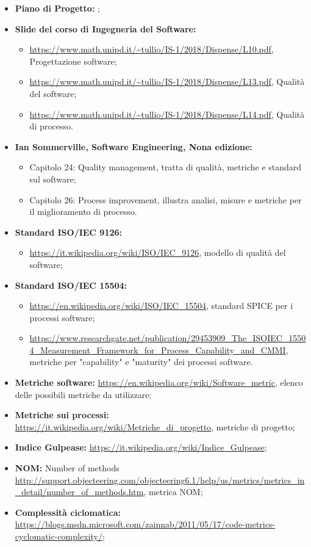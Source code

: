 \begin{itemize}
	\item \textbf{Piano di Progetto:} \PdP;
	\item \textbf{Slide del corso di Ingegneria del Software:}
	\begin{itemize}
				   \item \url{https://www.math.unipd.it/~tullio/IS-1/2018/Dispense/L10.pdf}, Progettazione software;
				   \item \url{https://www.math.unipd.it/~tullio/IS-1/2018/Dispense/L13.pdf}, Qualità del software;
				   \item \url{https://www.math.unipd.it/~tullio/IS-1/2018/Dispense/L14.pdf}, Qualità di processo.
	\end{itemize}
	\item \textbf{Ian Sommerville, Software Engineering, Nona edizione:}
		\begin{itemize}
		  	\item Capitolo 24: Quality management, tratta di qualità, metriche e standard sul software;
		  	\item Capitolo 26: Process improvement, illustra analisi, misure e metriche per il miglioramento di processo.
		\end{itemize}
	\item \textbf{Standard ISO/IEC 9126:}
		\begin{itemize}
			\item \url{https://it.wikipedia.org/wiki/ISO/IEC_9126}, modello di qualità del software;
		\end{itemize}
	\item \textbf{Standard ISO/IEC 15504:}
		 \begin{itemize}
				 \item \url{https://en.wikipedia.org/wiki/ISO/IEC_15504}, standard SPICE per i processi software;
				  \item \url{https://www.researchgate.net/publication/29453909_The_ISOIEC_15504_Measurement_Framework_for_Process_Capability_and_CMMI}, metriche per "capability" e "maturity" dei processi software.
		\end{itemize}
	\item \textbf{Metriche software:}\newline
				  \url{https://en.wikipedia.org/wiki/Software_metric}, elenco delle possibili metriche da utilizzare;
	\item \textbf{Metriche sui processi:}\newline
				  \url{https://it.wikipedia.org/wiki/Metriche_di_progetto}, metriche di progetto;
	\item \textbf{Indice Gulpease:}\newline
				 \url{https://it.wikipedia.org/wiki/Indice_Gulpease};
	\item \textbf{NOM:} Number of methods\newline
				  \url{http://support.objecteering.com/objecteering6.1/help/us/metrics/metrics_in_detail/number_of_methods.htm}, metrica NOM;
	\item \textbf{Complessità ciclomatica: }\newline
				 \url{https://blogs.msdn.microsoft.com/zainnab/2011/05/17/code-metrics-cyclomatic-complexity/};
		
\end{itemize}